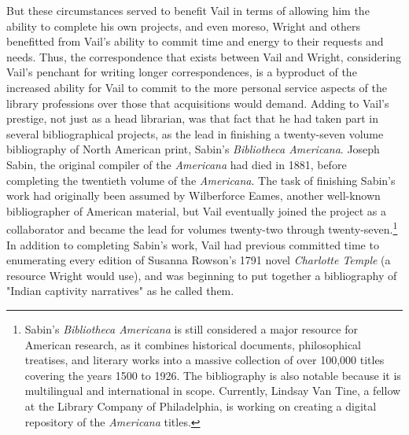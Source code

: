 But these circumstances served to benefit Vail in terms of allowing him the ability to complete his own projects, and even moreso, Wright and others benefitted from Vail's ability to commit time and energy to their requests and needs.\autocite[220-3,225,231]{gura_american_2012} Thus, the correspondence that exists between Vail and Wright, considering Vail's penchant for writing longer correspondences, is a byproduct of the increased ability for Vail to commit to the more personal service aspects of the library professions over those that acquisitions would demand. Adding to Vail's prestige, not just as a head librarian, was that fact that he had taken part in several bibliographical projects, as the lead in finishing a twenty-seven volume bibliography of North American print, Sabin's \textit{Bibliotheca Americana}. Joseph Sabin, the original compiler of the \textit{Americana} had died in 1881, before completing the twentieth volume of the \textit{Americana}. The task of finishing Sabin's work had originally been assumed by Wilberforce Eames, another well-known bibliographer of American material, but Vail eventually joined the project as a collaborator and became the lead for volumes twenty-two through twenty-seven.\footnote{Sabin's \textit{Bibliotheca Americana} is still considered a major resource for American research, as it combines historical documents, philosophical treatises, and literary works into a massive collection of over 100,000 titles covering the years 1500 to 1926. The bibliography is also notable because it is multilingual and international in scope. Currently, Lindsay Van Tine, a fellow at the Library Company of Philadelphia, is working on creating a digital repository of the \textit{Americana} titles.} In addition to completing Sabin's work, Vail had previous committed time to enumerating every edition of Susanna Rowson's 1791 novel \textit{Charlotte Temple} (a resource Wright would use), and was beginning to put together a bibliography of "Indian captivity narratives" as he called them.\autocite{vail_susanna_1933,vail_voice_1949}

